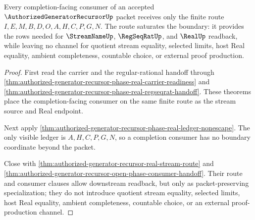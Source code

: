 \begin{theorem}
\label{thm:authorized-generator-recursor-completion-boundary-saturation}
Every completion-facing consumer of an accepted $\AuthorizedGeneratorRecursorUp$ packet receives only the finite route $I,E,M,B,D,O,A,H,C,P,G,N$. The route saturates the boundary: it provides the rows needed for $\StreamNameUp$, $\RegSeqRatUp$, and $\RealUp$ readback, while leaving no channel for quotient stream equality, selected limits, host Real equality, ambient completeness, countable choice, or external proof production.
\end{theorem}
\begin{proof}
First read the carrier and the regular-rational handoff through \autoref{thm:authorized-generator-recursor-phase-real-carrier-readiness} and \autoref{thm:authorized-generator-recursor-phase-real-regseqrat-handoff}. These theorems place the completion-facing consumer on the same finite route as the stream source and Real endpoint.

Next apply \autoref{thm:authorized-generator-recursor-phase-real-ledger-nonescape}. The only visible ledger is $A,H,C,P,G,N$, so a completion consumer has no boundary coordinate beyond the packet.

Close with \autoref{thm:authorized-generator-recursor-real-stream-route} and \autoref{thm:authorized-generator-recursor-open-phase-consumer-handoff}. Their route and consumer clauses allow downstream readback, but only as packet-preserving specialization; they do not introduce quotient stream equality, selected limits, host Real equality, ambient completeness, countable choice, or an external proof-production channel.
\end{proof}

